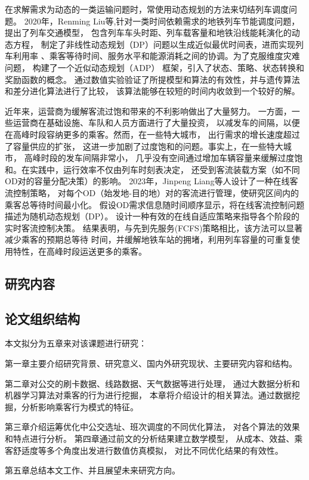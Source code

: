 在求解需求为动态的一类运输问题时，常使用动态规划的方法来切结列车调度问题。
2020年，Renming Liu等,针对一类时间依赖需求的地铁列车节能调度问题，提出了列车交通模型\cite{8337127}，
包含列车车头时距、列车载客量和地铁沿线能耗演化的动态方程，
制定了非线性动态规划（DP）问题以生成近似最优时间表，进而实现列车利用率
、乘客等待时间、服务水平和能源消耗之间的协调。为了克服维度灾难问题，
构建了一个近似动态规划（ADP） 框架，引入了状态、策略、状态转换和奖励函数的概念。
通过数值实验验证了所提模型和算法的有效性，并与遗传算法和差分进化算法进行了比较，
该算法能够在较短的时间内收敛到一个较好的解。


近年来，运营商为缓解客流过饱和带来的不利影响做出了大量努力。
一方面，一些运营商在基础设施、车队和人员方面进行了大量投资，
以减发车的间隔，以便在高峰时段容纳更多的乘客。然而，在一些特大城市，
出行需求的增长速度超过了容量供应的扩张，
这进一步加剧了过度饱和的问题。事实上，在一些特大城市，
高峰时段的发车间隔非常小，
几乎没有空间通过增加车辆容量来缓解过度饱和。在实践中，运行效率不仅由列车时刻表决定，
还受到客流装载方案（如不同OD对的容量分配决策\cite{CHIERICI200499}）的影响。
2023年，Jinpeng Liang等人设计了一种在线客流控制策略\cite{LIANG2023102845}，
对每个OD（始发地-目的地）对的客流进行管理，使研究区间内的乘客总等待时间最小化。
假设OD需求信息随时间顺序显示，将在线客流控制问题描述为随机动态规划（DP）。
设计一种有效的在线自适应策略来指导各个阶段的实时客流控制决策。
结果表明，与先到先服务(FCFS)策略相比，该方法可以显著减少乘客的预期总等待
时间，并缓解地铁车站的拥堵，利用列车容量的可重复使用特性，在高峰时段运送更多的乘客。



\subsection{研究内容}

\subsection{论文组织结构}
本文拟分为五章来对该课题进行研究：

第一章主要介绍研究背景、研究意义、国内外研究现状、主要研究内容和结构。

第二章对公交的刷卡数据、线路数据、天气数据等进行处理，
通过大数据分析和机器学习算法对乘客的行为进行挖掘，
本章将介绍设计的相关算法。通过数据挖掘，分析影响乘客行为模式的特征。

第三章介绍运筹优化中公交选址、班次调度的不同优化算法，
对各个算法的效果和特点进行分析。
第四章通过前文的分析结果建立数学模型，
从成本、效益、乘客舒适度等多个角度出发进行数值仿真模拟，
对比不同优化结果的有效性。

第五章总结本文工作、并且展望未来研究方向。